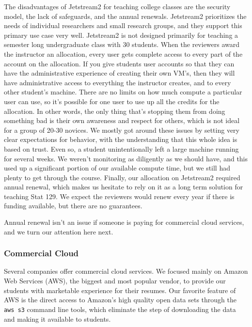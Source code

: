 \documentclass[12pt]{article}
\begin{document}
The disadvantages of Jetstream2 for teaching college classes are the security model, the lack of safeguards, and the annual renewals.
Jetstream2 prioritizes the needs of individual researchers and small research groups, and they support this primary use case very well.
Jetstream2 is not designed primarily for teaching a semester long undergraduate class with 30 students.
When the reviewers award the instructor an allocation, every user gets complete access to every part of the account on the allocation.
If you give students user accounts so that they can have the administrative experience of creating their own VM's, then they will have administrative access to everything the instructor creates, and to every other student's machine.
There are no limits on how much compute a particular user can use, so it's possible for one user to use up all the credits for the allocation.
In other words, the only thing that's stopping them from doing something bad is their own awareness and respect for others, which is not ideal for a group of 20-30 novices.
We mostly got around these issues by setting very clear expectations for behavior, with the understanding that this whole idea is based on trust.
Even so, a student unintentionally left a large machine running for several weeks.
We weren't monitoring as diligently as we should have, and this used up a significant portion of our available compute time, but we still had plenty to get through the course.
Finally, our allocation on Jetstream2 required annual renewal, which makes us hesitate to rely on it as a long term solution for teaching Stat 129.
We expect the reviewers would renew every year if there is funding available, but there are no guarantees.

Annual renewal isn't an issue if someone is paying for commercial cloud services, and we turn our attention here next.


\subsubsection{Commercial Cloud}
\label{sec:comcloud}

Several companies offer commercial cloud services.
We focused mainly on Amazon Web Services (AWS), the biggest and most popular vendor, to provide our students with marketable experience for their resumes.
Our favorite feature of AWS is the direct access to Amazon's high quality open data sets through the \texttt{aws s3} command line tools, which eliminate the step of downloading the data and making it available to students.
\end{document}

